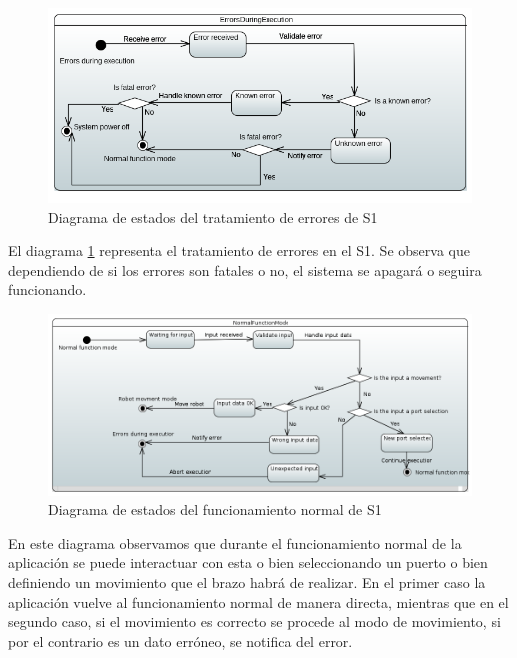 \begin{figure}[H]
    \centering
    \includegraphics[width=\linewidth]{pictures/S1ErrorsDuringExecution.PNG}
    \caption{Diagrama de estados del tratamiento de errores de \ac{S1}}
    \label{fig:diagrama_estados_error_s1}
\end{figure}

El diagrama \ref{fig:diagrama_estados_error_s1} representa el tratamiento de errores en el \ac{S1}.
Se observa que dependiendo de si los errores son fatales o no, el sistema se apagará o seguira funcionando.

\begin{figure}[H]
    \centering
    \includegraphics[width=\linewidth]{pictures/S1NormalFunctionMode.PNG}
    \caption{Diagrama de estados del funcionamiento normal de \ac{S1}}
    \label{fig:diagrama_estados_normal_s1}
\end{figure}

En este diagrama observamos que durante el funcionamiento normal de la aplicación se puede interactuar con esta o bien seleccionando un puerto o bien definiendo un movimiento que el brazo habrá de realizar.
En el primer caso la aplicación vuelve al funcionamiento normal de manera directa, mientras que en el segundo caso, si el movimiento es correcto se procede al modo de movimiento, si por el contrario es un dato erróneo, se notifica del error.

